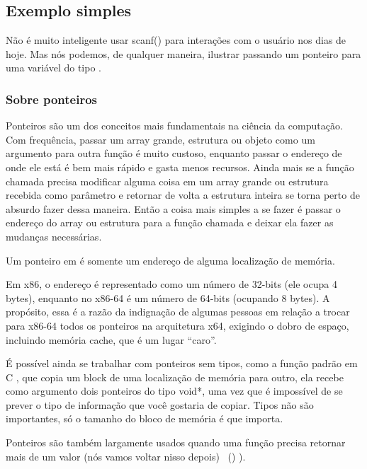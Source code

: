 \subsection{Exemplo simples}



Não é muito inteligente usar scanf() para interações com o usuário nos dias de hoje.
Mas nós podemos, de qualquer maneira, ilustrar passando um ponteiro para uma variável do tipo \Tint.

\subsubsection{Sobre ponteiros}
\myindex{\CLanguageElements!\Pointers}

Ponteiros são um dos conceitos mais fundamentais na ciência da computação.
Com frequência, passar um array grande, estrutura ou objeto como um argumento para outra função é muito custoso, enquanto passar o endereço de onde ele está é bem mais rápido e gasta menos recursos.
Ainda mais se a função chamada precisa modificar alguma coisa em um array grande ou estrutura recebida como parâmetro e retornar de volta a estrutura inteira se torna perto de absurdo fazer dessa maneira.
Então a coisa mais simples a se fazer é passar o endereço do array ou estrutura para a função chamada e deixar ela fazer as mudanças necessárias.

Um ponteiro em \CCpp é somente um endereço de alguma localização de memória.

Em x86, o endereço é representado como um número de 32-bits (ele ocupa 4 bytes), enquanto no x86-64 é um número de 64-bits (ocupando 8 bytes).
A propósito, essa é a razão da indignação de algumas pessoas em relação a trocar para x86-64 todos os ponteiros na arquitetura x64, exigindo o dobro de espaço, incluindo memória cache, que é um lugar ``caro''.

É possível ainda se trabalhar com ponteiros sem tipos, como a função padrão em C , que copia um block de uma localização de memória para outro,
ela recebe como argumento dois ponteiros do tipo void*, uma vez que é impossível de se prever o tipo de informação que você gostaria de copiar.
Tipos não são importantes, só o tamanho do bloco de memória é que importa.

Ponteiros são também largamente usados quando uma função precisa retornar mais de um valor
(nós vamos voltar nisso depois)
~()
).


